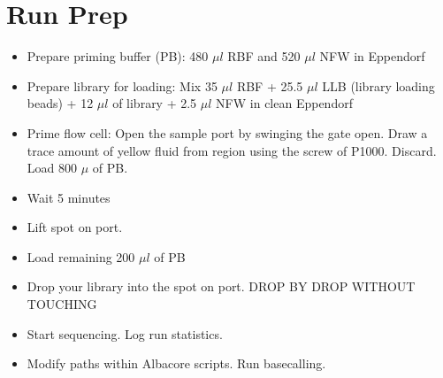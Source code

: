 \documentclass[aps,rmp]{revtex4}
\begin{document}
\section*{Run Prep}
\begin{itemize}
	\item Prepare priming buffer (PB): 480 $\mu l$ RBF and 520 $\mu l$ NFW in Eppendorf 
	\item Prepare library for loading: Mix 35 $\mu l$ RBF + 25.5 $\mu l$ LLB (library loading beads) + 12 $\mu l$ of library + 2.5 $\mu l $ NFW in clean Eppendorf
	\item Prime flow cell: Open the sample port by swinging the gate open. Draw a trace amount of yellow fluid from region using the screw of P1000. Discard. Load 800 $\mu $ of PB.
	\item Wait 5 minutes
	\item Lift spot on port.
	\item Load remaining 200 $\mu l$ of PB
	\item Drop your library into the spot on port. DROP BY DROP WITHOUT TOUCHING
	\item Start sequencing. Log run statistics.
	\item Modify paths within Albacore scripts. Run basecalling.
\end{itemize}
\end{document}
